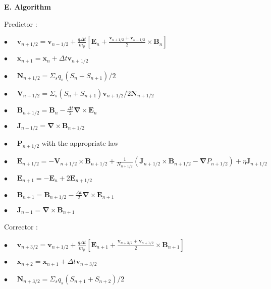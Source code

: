 \documentclass[a4paper,11pt]{letter}
\begin{document}
\newpage

{\bf E. Algorithm}

Predictor :

$\displaystyle \bullet \,\,\,\,\,\,\,\, \mathbf v_{n+1/2} = \mathbf v_{n-1/2} + \frac{q \Delta t}{m_p} \left[\mathbf E_n + \frac{\mathbf v_{n+1/2} + \mathbf v_{n-1/2}}{2} \times \mathbf B_n\right]$

$\displaystyle \bullet \,\,\,\,\,\,\,\, \mathbf x_{n+1} = \mathbf x_n + \Delta t \mathbf v_{n+1/2}$

$\displaystyle \bullet \,\,\,\,\,\,\,\, \mathbf N_{n+1/2} = \Sigma_s q_s (S_n + S_{n+1})/2$

$\displaystyle \bullet \,\,\,\,\,\,\,\, \mathbf V_{n+1/2} = \Sigma_s (S_n + S_{n+1}) \mathbf v_{n+1/2} / 2 \mathbf N_{n+1/2}$

$\displaystyle \bullet \,\,\,\,\,\,\,\, \mathbf B_{n+1/2} = \mathbf B_n - \frac{\Delta t}{2} \boldsymbol{\nabla} \times \mathbf E_n$

$\displaystyle \bullet \,\,\,\,\,\,\,\, \mathbf J_{n+1/2} = \boldsymbol{\nabla} \times \mathbf B_{n+1/2}$

$\displaystyle \bullet \,\,\,\,\,\,\,\, \mathbf P_{n+1/2}$ with the appropriate law

$\displaystyle \bullet \,\,\,\,\,\,\,\, \mathbf E_{n+1/2} = - \mathbf V_{n+1/2} \times \mathbf B_{n+1/2} + \frac{1}{N_{n+1/2}} \left( \mathbf J_{n+1/2} \times \mathbf B_{n+1/2} - \boldsymbol{\nabla} P_{n+1/2} \right) + \eta \mathbf J_{n+1/2}$

$\displaystyle \bullet \,\,\,\,\,\,\,\, \mathbf E_{n+1} = - \mathbf E_n + 2 \mathbf E_{n+1/2}$

$\displaystyle \bullet \,\,\,\,\,\,\,\, \mathbf B_{n+1} = \mathbf B_{n+1/2} - \frac{\Delta t}{2} \boldsymbol{\nabla} \times \mathbf E_{n+1}$

$\displaystyle \bullet \,\,\,\,\,\,\,\, \mathbf J_{n+1} = \boldsymbol{\nabla} \times \mathbf B_{n+1}$

\bigskip

Corrector :

$\displaystyle \bullet \,\,\,\,\,\,\,\, \mathbf v_{n+3/2} = \mathbf v_{n+1/2} + \frac{q \Delta t}{m_p} \left[\mathbf E_{n+1} + \frac{\mathbf v_{n+3/2} + \mathbf v_{n+1/2}}{2} \times \mathbf B_{n+1}\right]$

$\displaystyle \bullet \,\,\,\,\,\,\,\, \mathbf x_{n+2} = \mathbf x_{n+1} + \Delta t \mathbf v_{n+3/2}$

$\displaystyle \bullet \,\,\,\,\,\,\,\, \mathbf N_{n+3/2} = \Sigma_s q_s (S_{n+1}+S_{n+2})/2$
\end{document}

